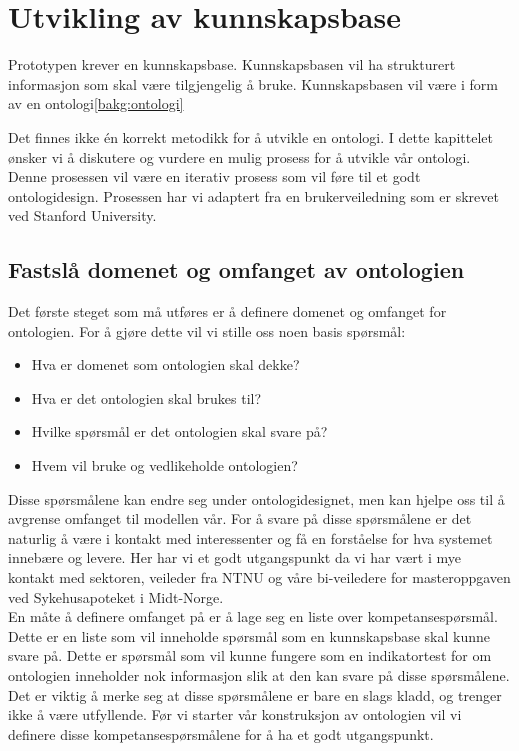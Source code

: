 \section{Utvikling av kunnskapsbase}
Prototypen krever en kunnskapsbase. Kunnskapsbasen vil ha strukturert informasjon som skal være tilgjengelig å bruke. Kunnskapsbasen vil være i form av en ontologi\ref{bakg:ontologi}

Det finnes ikke én korrekt metodikk for å utvikle en ontologi. I dette kapittelet ønsker vi å diskutere og vurdere en mulig prosess for å utvikle vår ontologi. Denne prosessen vil være en iterativ prosess som vil føre til et godt ontologidesign. Prosessen har vi adaptert fra en brukerveiledning som er skrevet ved Stanford University. \citep{ontology_101}
\subsection{Fastslå domenet og omfanget av ontologien}
Det første steget som må utføres er å definere domenet og omfanget for ontologien. For å gjøre dette vil vi stille oss noen basis spørsmål:
\begin{itemize}
\item Hva er domenet som ontologien skal dekke?
\item Hva er det ontologien skal brukes til?
\item Hvilke spørsmål er det ontologien skal svare på?
\item Hvem vil bruke og vedlikeholde ontologien?
\end{itemize}
Disse spørsmålene kan endre seg under ontologidesignet, men kan hjelpe oss til å avgrense omfanget til modellen vår. For å svare på disse spørsmålene er det naturlig å være i kontakt med interessenter og få en forståelse for hva systemet innebære og levere. Her har vi et godt utgangspunkt da vi har vært i mye kontakt med sektoren, veileder fra NTNU og våre bi-veiledere for masteroppgaven ved Sykehusapoteket i Midt-Norge. \\
En måte å definere omfanget på er å lage seg en liste over kompetansespørsmål. Dette er en liste som vil inneholde spørsmål som en kunnskapsbase skal kunne svare på. Dette er spørsmål som vil kunne fungere som en indikatortest for om ontologien inneholder nok informasjon slik at den kan svare på disse spørsmålene. Det er viktig å merke seg at disse spørsmålene er bare en slags kladd, og trenger ikke å være utfyllende. Før vi starter vår konstruksjon av ontologien vil vi definere disse kompetansespørsmålene for å ha et godt utgangspunkt.

